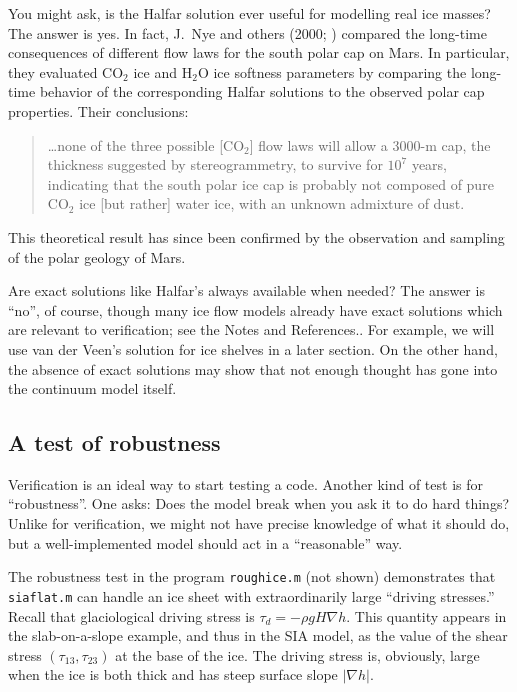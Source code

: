 \documentclass[letterpaper,final,12pt,reqno]{amsart}
\newcommand{\grad}{\nabla}
\begin{document}
You might ask, is the Halfar solution ever useful for modelling real ice masses?  The answer is yes.  In fact, J.~Nye and others (2000; \cite{NyeIcarus2000}) compared the long-time consequences of different flow laws for the south polar cap on Mars.  In particular, they evaluated $\text{CO}_2$ ice and $\text{H}_2\text{O}$ ice softness parameters by comparing the long-time behavior of the corresponding Halfar solutions to the observed polar cap properties.  Their conclusions:
  \begin{quote}
  \dots none of the three possible [$\text{CO}_2$] flow laws will allow a 3000-m cap, the thickness suggested by stereogrammetry, to survive for $10^7$ years, indicating that the south polar ice cap is probably not composed of pure $\text{CO}_2$ ice [but rather] water ice, with an unknown admixture of dust.
  \end{quote}
This theoretical result has since been confirmed by the observation and sampling of the polar geology of Mars.

Are exact solutions like Halfar's always available when needed?  The answer is ``no'', of course, though many ice flow models already have exact solutions which are relevant to verification; see the Notes and References..  For example, we will use van der Veen's solution for ice shelves in a later section.  On the other hand, the absence of exact solutions may show that not enough thought has gone into the continuum model itself.

\subsection*{A test of robustness}  Verification is an ideal way to start testing a code.  Another kind of test is for ``robustness''.  One asks: Does the model break when you ask it to do hard things?  Unlike for verification, we might not have precise knowledge of what it should do, but a well-implemented model should act in a ``reasonable'' way.

The robustness test in the program \texttt{roughice.m} (not shown) demonstrates that \texttt{siaflat.m} can handle an ice sheet with extraordinarily large ``driving stresses.''  Recall that glaciological driving stress is $\tau_d = - \rho g H \grad h$.  This quantity appears in the slab-on-a-slope example, and thus in the SIA model, as the value of the shear stress $(\tau_{13},\tau_{23})$ at the base of the ice.  The driving stress is, obviously, large when the ice is both thick and has steep surface slope $|\nabla h|$.
\end{document}
